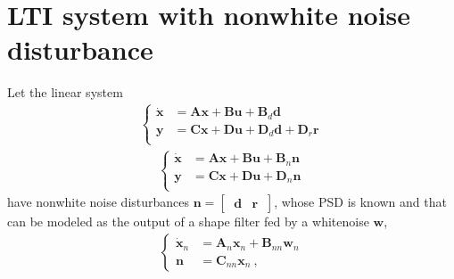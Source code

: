 \documentclass[letterpaper,10pt,english]{jupyterBook}
\begin{document}
\section{LTI system with non\sphinxhyphen{}white noise disturbance}
\label{\detokenize{ch/system-theory/shape-filter:lti-system-with-non-white-noise-disturbance}}\label{\detokenize{ch/system-theory/shape-filter:system-theory-shape-filter-augmented-system}}
\sphinxAtStartPar
Let the linear system
\begin{equation*}
\begin{split}\left\{\begin{aligned}
  \dot{\mathbf{x}} & = \mathbf{A} \mathbf{x} + \mathbf{B} \mathbf{u} + \mathbf{B}_d \mathbf{d} \\
       \mathbf{y}  & = \mathbf{C} \mathbf{x} + \mathbf{D} \mathbf{u} + \mathbf{D}_d \mathbf{d} + \mathbf{D}_r \mathbf{r} \\
\end{aligned}\right.\end{split}
\end{equation*}\begin{equation*}
\begin{split}\left\{\begin{aligned}
  \dot{\mathbf{x}} & = \mathbf{A} \mathbf{x} + \mathbf{B} \mathbf{u} + \mathbf{B}_n \mathbf{n} \\
       \mathbf{y}  & = \mathbf{C} \mathbf{x} + \mathbf{D} \mathbf{u} + \mathbf{D}_n \mathbf{n} \\
\end{aligned}\right.\end{split}
\end{equation*}
\sphinxAtStartPar
have non\sphinxhyphen{}white noise disturbances \(\mathbf{n} = \begin{bmatrix} \ \mathbf{d} & \mathbf{r} \ \end{bmatrix}\), whose PSD is known and that can be modeled as the output of a shape filter fed by a white\sphinxhyphen{}noise \(\mathbf{w}\),
\begin{equation*}
\begin{split}\left\{\begin{aligned}
  \dot{\mathbf{x}}_n & = \mathbf{A}_{n}  \mathbf{x}_n + \mathbf{B}_{nn} \mathbf{w}_n  \\
       \mathbf{n}    & = \mathbf{C}_{nn} \mathbf{x}_n  \ ,
\end{aligned}\right.\end{split}
\end{equation*}
\sphinxAtStartPar
\end{document}
